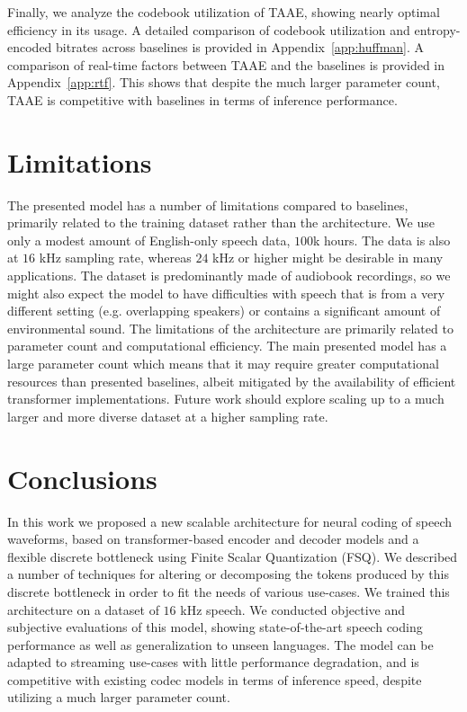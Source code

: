 \documentclass{article} %
\begin{document}
Finally, we analyze the codebook utilization of TAAE, showing nearly optimal efficiency in its usage. A detailed comparison of codebook utilization and entropy-encoded bitrates across baselines is provided in Appendix~\ref{app:huffman}. A comparison of real-time factors between TAAE and the baselines is provided in Appendix~\ref{app:rtf}. This shows that despite the much larger parameter count, TAAE is competitive with baselines in terms of inference performance.

\section{Limitations}
The presented model has a number of limitations compared to baselines, primarily related to the training dataset rather than the architecture. We use only a modest amount of English-only speech data, $100$k hours. The data is also at $16$ kHz sampling rate, whereas $24$ kHz or higher might be desirable in many applications. The dataset is predominantly made of audiobook recordings, so we might also expect the model to have difficulties with speech that is from a very different setting (e.g. overlapping speakers) or contains a significant amount of environmental sound. The limitations of the architecture are primarily related to parameter count and computational efficiency. The main presented model has a large parameter count which means that it may require greater computational resources than presented baselines, albeit mitigated by the availability of efficient transformer implementations. Future work should explore scaling up to a much larger and more diverse dataset at a higher sampling rate.

 \vspace{-2mm}
\section{Conclusions}
\vspace{-2mm}
In this work we proposed a new scalable architecture for neural coding of speech waveforms, based on transformer-based encoder and decoder models and a flexible discrete bottleneck using Finite Scalar Quantization (FSQ). We described a number of techniques for altering or decomposing the tokens produced by this discrete bottleneck in order to fit the needs of various use-cases. We trained this architecture on a dataset of $16$ kHz speech. We conducted objective and subjective evaluations of this model, showing state-of-the-art speech coding performance as well as generalization to unseen languages. The model can be adapted to streaming use-cases with little performance degradation, and is competitive with existing codec models in terms of inference speed, despite utilizing a much larger parameter count.
\end{document}
